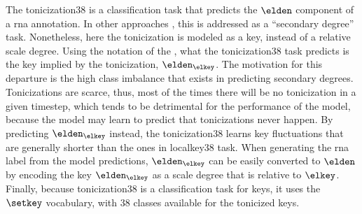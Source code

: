 

The \gls{tonicization38} is a classification task that
predicts the $\elden$ component of a \gls{rna} annotation.
In other approaches
\parencite{chen2021attend,micchi2021deep}, this is addressed
as a ``secondary degree'' task. Nonetheless, here the
tonicization is modeled as a key, instead of a relative
scale degree. Using the notation of the
, what
the \gls{tonicization38} task predicts is the key implied by
the tonicization, $\elden_{\elkey}$. The motivation for this
departure is the high class imbalance that exists in
predicting secondary degrees. Tonicizations are scarce,
thus, most of the times there will be no tonicization in a
given timestep, which tends to be detrimental for the
performance of the model, because the model may learn to
predict that tonicizations never happen. By predicting
$\elden_{\elkey}$ instead, the \gls{tonicization38} learns
key fluctuations that are generally shorter than the ones in
\gls{localkey38} task. When generating the \gls{rna} label
from the model predictions, $\elden_{\elkey}$ can be easily
converted to $\elden$ by encoding the key $\elden_{\elkey}$
as a scale degree that is relative to $\elkey$. Finally,
because \gls{tonicization38} is a classification task for
keys, it uses the $\setkey$ vocabulary, with 38 classes
available for the tonicized keys.


